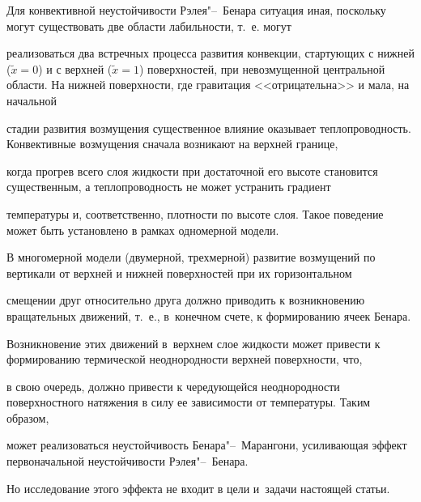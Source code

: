Для конвективной неустойчивости Рэлея"--~Бенара ситуация иная, поскольку могут существовать две области лабильности, т.~е. могут

реализоваться два встречных процесса развития конвекции, стартующих с нижней ($\widetilde{x}=0$) и с верхней ($\widetilde{x}=1$) поверхностей, при невозмущенной центральной области. На нижней поверхности, где гравитация <<отрицательна>> и мала, на начальной

стадии развития возмущения существенное влияние оказывает теплопроводность. Конвективные возмущения сначала возникают на верхней границе,

когда прогрев всего слоя жидкости при достаточной его высоте становится существенным, а теплопроводность не может устранить градиент

температуры и, соответственно, плотности по высоте слоя. Такое поведение может быть установлено в рамках одномерной модели.

В многомерной модели (двумерной, трехмерной) развитие возмущений по вертикали от верхней и нижней поверхностей при их горизонтальном

смещении друг относительно друга должно приводить к возникновению вращательных движений, т.~е., в~конечном счете, к формированию ячеек Бенара.

Возникновение этих движений в~верхнем слое жидкости может привести к формированию термической неоднородности верхней поверхности, что,

в свою очередь, должно привести к чередующейся неоднородности поверхностного натяжения в силу ее зависимости от температуры. Таким образом,

может реализоваться неустойчивость Бенара"--~Марангони, усиливающая эффект первоначальной неустойчивости Рэлея"--~Бенара. 

Но исследование этого эффекта не входит в цели и~задачи настоящей статьи.










